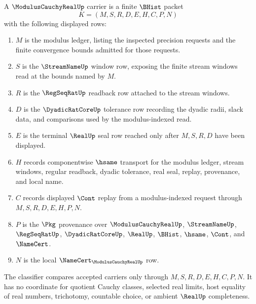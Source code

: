 \begin{definition}
\label{def:modulus-cauchy-real-carrier}
A $\ModulusCauchyRealUp$ carrier is a finite $\BHist$ packet
$$
K=(M,S,R,D,E,H,C,P,N)
$$
with the following displayed rows:
\begin{enumerate}
\item $M$ is the modulus ledger, listing the inspected precision requests and the finite convergence bounds admitted for those requests.
\item $S$ is the $\StreamNameUp$ window row, exposing the finite stream windows read at the bounds named by $M$.
\item $R$ is the $\RegSeqRatUp$ readback row attached to the stream windows.
\item $D$ is the $\DyadicRatCoreUp$ tolerance row recording the dyadic radii, slack data, and comparisons used by the modulus-indexed read.
\item $E$ is the terminal $\RealUp$ seal row reached only after $M,S,R,D$ have been displayed.
\item $H$ records componentwise $\hsame$ transport for the modulus ledger, stream windows, regular readback, dyadic tolerance, real seal, replay, provenance, and local name.
\item $C$ records displayed $\Cont$ replay from a modulus-indexed request through $M,S,R,D,E,H,P,N$.
\item $P$ is the $\Pkg$ provenance over $\ModulusCauchyRealUp$, $\StreamNameUp$, $\RegSeqRatUp$, $\DyadicRatCoreUp$, $\RealUp$, $\BHist$, $\hsame$, $\Cont$, and $\NameCert$.
\item $N$ is the local $\NameCert_{\ModulusCauchyRealUp}$ row.
\end{enumerate}
The classifier compares accepted carriers only through $M,S,R,D,E,H,C,P,N$. It has no coordinate for quotient Cauchy classes, selected real limits, host equality of real numbers, trichotomy, countable choice, or ambient $\RealUp$ completeness.
\end{definition}

